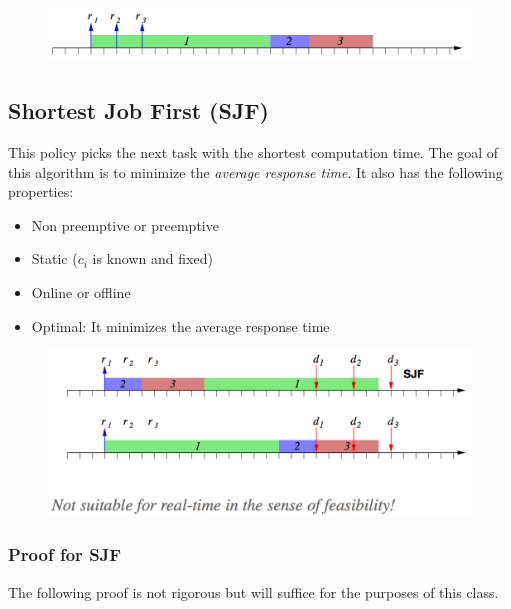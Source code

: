 \documentclass{hw}
\begin{document}
\begin{figure}[H]
  \centering
  \includegraphics[scale=.6]{fcfs2}
\end{figure}

\subsection{Shortest Job First (SJF)}
This policy picks the next task with the shortest computation time. The goal of 
this algorithm is to minimize the \emph{average response time}. It also has the
following properties:
\begin{itemize}
  \item Non preemptive or preemptive
  \item Static ($c_{i}$ is known and fixed)
  \item Online or offline
  \item Optimal: It minimizes the average response time
\end{itemize}

\begin{figure}[H]
  \centering
  \includegraphics[scale=.6]{sjf}
\end{figure}

\subsubsection{Proof for SJF}
The following proof is not rigorous but will suffice for the purposes of this
class. \\
\end{document}
